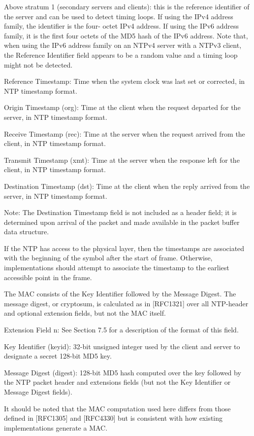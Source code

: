 Above stratum 1 (secondary servers and clients): this is the
reference identifier of the server and can be used to detect timing
loops. If using the IPv4 address family, the identifier is the four-
octet IPv4 address. If using the IPv6 address family, it is the
first four octets of the MD5 hash of the IPv6 address. Note that,
when using the IPv6 address family on an NTPv4 server with a NTPv3
client, the Reference Identifier field appears to be a random value
and a timing loop might not be detected.

Reference Timestamp: Time when the system clock was last set or
corrected, in NTP timestamp format.

Origin Timestamp (org): Time at the client when the request departed
for the server, in NTP timestamp format.

Receive Timestamp (rec): Time at the server when the request arrived
from the client, in NTP timestamp format.

Transmit Timestamp (xmt): Time at the server when the response left
for the client, in NTP timestamp format.

Destination Timestamp (dst): Time at the client when the reply
arrived from the server, in NTP timestamp format.

Note: The Destination Timestamp field is not included as a header
field; it is determined upon arrival of the packet and made available
in the packet buffer data structure.

If the NTP has access to the physical layer, then the timestamps are
associated with the beginning of the symbol after the start of frame.
Otherwise, implementations should attempt to associate the timestamp
to the earliest accessible point in the frame.

The MAC consists of the Key Identifier followed by the Message
Digest. The message digest, or cryptosum, is calculated as in
[RFC1321] over all NTP-header and optional extension fields, but not
the MAC itself.

Extension Field n: See Section 7.5 for a description of the format of
this field.

Key Identifier (keyid): 32-bit unsigned integer used by the client
and server to designate a secret 128-bit MD5 key.

Message Digest (digest): 128-bit MD5 hash computed over the key
followed by the NTP packet header and extensions fields (but not the
Key Identifier or Message Digest fields).

It should be noted that the MAC computation used here differs from
those defined in [RFC1305] and [RFC4330] but is consistent with how
existing implementations generate a MAC.

